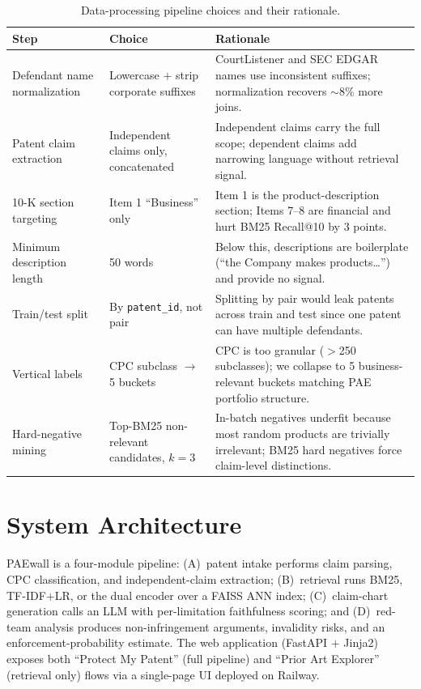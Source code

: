 \documentclass[11pt]{article}
\begin{document}
\begin{table}[h]
\centering
\caption{Data-processing pipeline choices and their rationale.}
\label{tab:pipeline}
\small
\begin{tabular}{p{3.2cm}p{3.5cm}p{7cm}}
\toprule
\textbf{Step} & \textbf{Choice} & \textbf{Rationale} \\
\midrule
Defendant name normalization & Lowercase $+$ strip corporate suffixes & CourtListener and SEC EDGAR names use inconsistent suffixes; normalization recovers $\sim$8\% more joins. \\
Patent claim extraction & Independent claims only, concatenated & Independent claims carry the full scope; dependent claims add narrowing language without retrieval signal. \\
10-K section targeting & Item 1 ``Business'' only & Item 1 is the product-description section; Items 7--8 are financial and hurt BM25 Recall@10 by 3 points. \\
Minimum description length & 50 words & Below this, descriptions are boilerplate (``the Company makes products\ldots'') and provide no signal. \\
Train/test split & By \texttt{patent\_id}, not pair & Splitting by pair would leak patents across train and test since one patent can have multiple defendants. \\
Vertical labels & CPC subclass $\to$ 5 buckets & CPC is too granular ($>$250 subclasses); we collapse to 5 business-relevant buckets matching PAE portfolio structure. \\
Hard-negative mining & Top-BM25 non-relevant candidates, $k{=}3$ & In-batch negatives underfit because most random products are trivially irrelevant; BM25 hard negatives force claim-level distinctions. \\
\bottomrule
\end{tabular}
\end{table}

\section{System Architecture}

PAEwall is a four-module pipeline: (A)~patent intake performs claim parsing, CPC classification, and independent-claim extraction; (B)~retrieval runs BM25, TF-IDF$+$LR, or the dual encoder over a FAISS ANN index; (C)~claim-chart generation calls an LLM with per-limitation faithfulness scoring; and (D)~red-team analysis produces non-infringement arguments, invalidity risks, and an enforcement-probability estimate. The web application (FastAPI $+$ Jinja2) exposes both ``Protect My Patent'' (full pipeline) and ``Prior Art Explorer'' (retrieval only) flows via a single-page UI deployed on Railway.
\end{document}
